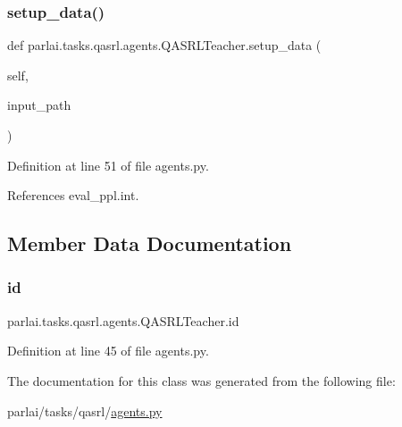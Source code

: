 \subsubsection{\texorpdfstring{setup\+\_\+data()}{setup\_data()}}
{\footnotesize\ttfamily def parlai.\+tasks.\+qasrl.\+agents.\+Q\+A\+S\+R\+L\+Teacher.\+setup\+\_\+data (\begin{DoxyParamCaption}\item[{}]{self,  }\item[{}]{input\+\_\+path }\end{DoxyParamCaption})}



Definition at line 51 of file agents.\+py.



References eval\+\_\+ppl.\+int.



\subsection{Member Data Documentation}
\mbox{\label{classparlai_1_1tasks_1_1qasrl_1_1agents_1_1QASRLTeacher_af5c5aa6c9bfe7adfebf9b58ca8ecec4c}} 
\subsubsection{\texorpdfstring{id}{id}}
{\footnotesize\ttfamily parlai.\+tasks.\+qasrl.\+agents.\+Q\+A\+S\+R\+L\+Teacher.\+id}



Definition at line 45 of file agents.\+py.



The documentation for this class was generated from the following file\+:\begin{DoxyCompactItemize}
\item 
parlai/tasks/qasrl/\hyperlink{parlai_2tasks_2qasrl_2agents_8py}{agents.\+py}\end{DoxyCompactItemize}

